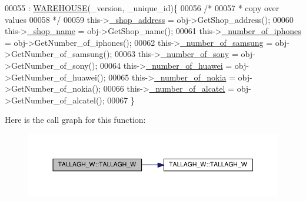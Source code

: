 \begin{DoxyCode}
00055                                                                          : 
      \hyperlink{class_w_a_r_e_h_o_u_s_e_a7a924d389af91f54ed0e1d1d8d56ec57_a7a924d389af91f54ed0e1d1d8d56ec57}{WAREHOUSE}(\_version, \_unique\_id)\{
00056         \textcolor{comment}{/*}
00057 \textcolor{comment}{         * copy over values
}
00058 \textcolor{comment}{         */}
00059         this->\hyperlink{class_t_a_l_l_a_g_h___w_a268003f2cd359fa50c6061f1ad011c67_a268003f2cd359fa50c6061f1ad011c67}{\_shop\_address} = obj->GetShop\_address();
00060         this->\hyperlink{class_t_a_l_l_a_g_h___w_a2d63785f290e8be76f3c4543e5df9508_a2d63785f290e8be76f3c4543e5df9508}{\_shop\_name} = obj->GetShop\_name();
00061         this->\hyperlink{class_t_a_l_l_a_g_h___w_ad8a7847f895cd13b45331e4f3cd20c2e_ad8a7847f895cd13b45331e4f3cd20c2e}{\_number\_of\_iphones} = obj->GetNumber\_of\_iphones();
00062         this->\hyperlink{class_t_a_l_l_a_g_h___w_a2438dbd2a390036bfd35f46a63b5b9bf_a2438dbd2a390036bfd35f46a63b5b9bf}{\_number\_of\_samsung} = obj->GetNumber\_of\_samsung();
00063         this->\hyperlink{class_t_a_l_l_a_g_h___w_ab101d3ac8747eef48371cd9078d2366e_ab101d3ac8747eef48371cd9078d2366e}{\_number\_of\_sony} = obj->GetNumber\_of\_sony();
00064         this->\hyperlink{class_t_a_l_l_a_g_h___w_ab966ff243f14eefc346e0b031f21c9b6_ab966ff243f14eefc346e0b031f21c9b6}{\_number\_of\_huawei} = obj->GetNumber\_of\_huawei();
00065         this->\hyperlink{class_t_a_l_l_a_g_h___w_aa095820dca65526e795d64f31a3aaec1_aa095820dca65526e795d64f31a3aaec1}{\_number\_of\_nokia} = obj->GetNumber\_of\_nokia();
00066         this->\hyperlink{class_t_a_l_l_a_g_h___w_a034f2ba8c42c1b81ae947b15732e5881_a034f2ba8c42c1b81ae947b15732e5881}{\_number\_of\_alcatel} = obj->GetNumber\_of\_alcatel();
00067     \}
\end{DoxyCode}


Here is the call graph for this function\+:\nopagebreak
\begin{figure}[H]
\begin{center}
\leavevmode
\includegraphics[width=350pt]{class_t_a_l_l_a_g_h___w_a34d0767d7e66f28b1e9725c27f964a9c_a34d0767d7e66f28b1e9725c27f964a9c_cgraph}
\end{center}
\end{figure}


